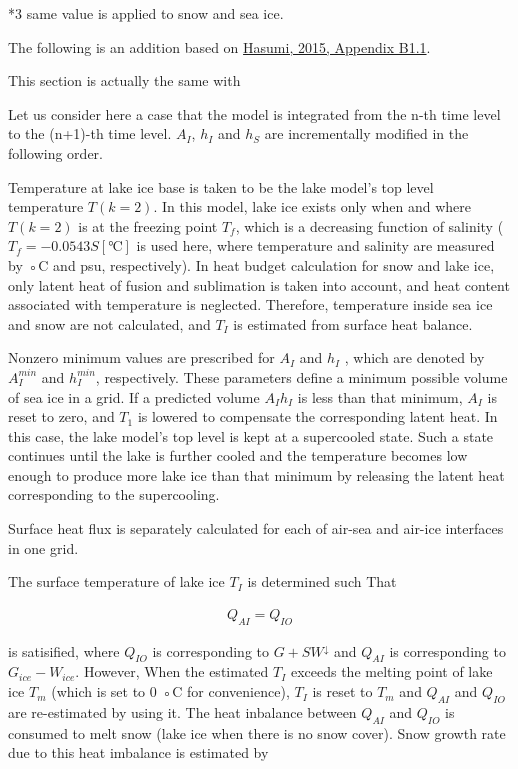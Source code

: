 *3 same value is applied to snow and sea ice.

The following is an addition based on
\href{https://ccsr.aori.u-tokyo.ac.jp/~hasumi/COCO/coco4.pdf}{Hasumi,
2015, Appendix B1.1}.

This section is actually the same with

Let us consider here a case that the model is integrated from the n-th
time level to the (n+1)-th time level. \(A_I\), \(h_I\) and \(h_S\) are
incrementally modified in the following order.

Temperature at lake ice base is taken to be the lake model's top level
temperature \(T(k=2)\). In this model, lake ice exists only when and
where \(T(k=2)\) is at the freezing point \(T_f\), which is a decreasing
function of salinity (\(T_f= −0.0543 S \mathrm{[℃]}\) is used here,
where temperature and salinity are measured by ◦C and psu,
respectively). In heat budget calculation for snow and lake ice, only
latent heat of fusion and sublimation is taken into account, and heat
content associated with temperature is neglected. Therefore, temperature
inside sea ice and snow are not calculated, and \(T_I\) is estimated
from surface heat balance.

Nonzero minimum values are prescribed for \(A_I\) and \(h_I\) , which
are denoted by \(A^{min}_I\) and \(h^{min}_I\), respectively. These
parameters define a minimum possible volume of sea ice in a grid. If a
predicted volume \(A_Ih_I\) is less than that minimum, \(A_I\) is reset
to zero, and \(T_1\) is lowered to compensate the corresponding latent
heat. In this case, the lake model's top level is kept at a supercooled
state. Such a state continues until the lake is further cooled and the
temperature becomes low enough to produce more lake ice than that
minimum by releasing the latent heat corresponding to the supercooling.

Surface heat flux is separately calculated for each of air-sea and
air-ice interfaces in one grid.

The surface temperature of lake ice \(T_I\) is determined such That

\begin{eqnarray}
    Q_{AI} = Q_{IO}
\end{eqnarray}

is satisified, where \(Q_{IO}\) is corresponding to \(G+SW^\downarrow\)
and \(Q_{AI}\) is corresponding to \(G_{ice} - W_{ice}\). However, When
the estimated \(T_I\) exceeds the melting point of lake ice \(T_m\)
(which is set to 0 ◦C for convenience), \(T_I\) is reset to \(T_m\) and
\(Q_{AI}\) and \(Q_{IO}\) are re-estimated by using it. The heat
inbalance between \(Q_{AI}\) and \(Q_{IO}\) is consumed to melt snow
(lake ice when there is no snow cover). Snow growth rate due to this
heat imbalance is estimated by


